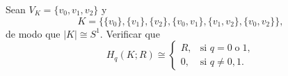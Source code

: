 \begin{ejercicio}
Sean $V_K = \{v_0, v_1, v_2\}$ y
\[
K = \big\{ \{v_0\}, \{v_1\}, \{v_2\}, \{v_0, v_1\}, \{v_1, v_2\}, \{v_0, v_2\} \big\},
\]
de modo que $|K| \cong S^1$. Verificar que
\[
H_q(K; R) \cong 
\begin{cases}
    R, & \text{si } q = 0 \; \text{o} \; 1, \\
    0, & \text{si } q \neq 0, 1.
\end{cases}
\]
\end{ejercicio}

\begin{demostracion}

\end{demostracion}
